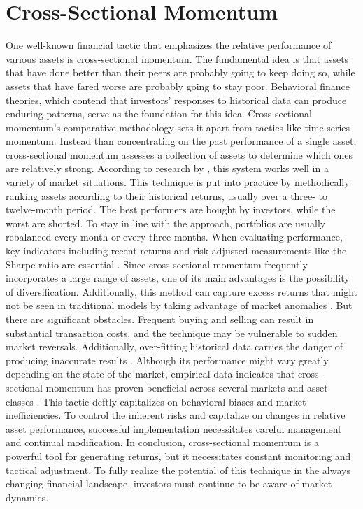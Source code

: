 \documentclass[11pt,a4paper,english,oneside]{book}
\begin{document}
\section{Cross-Sectional Momentum}
One well-known financial tactic that emphasizes the relative performance of various assets is cross-sectional momentum. The fundamental idea is that assets that have done better than their peers are probably going to keep doing so, while assets that have fared worse are probably going to stay poor. Behavioral finance theories, which contend that investors' responses to historical data can produce enduring patterns, serve as the foundation for this idea.
Cross-sectional momentum's comparative methodology sets it apart from tactics like time-series momentum. Instead than concentrating on the past performance of a single asset, cross-sectional momentum assesses a collection of assets to determine which ones are relatively strong. According to research by \cite{jegadeesh1993returns}, this system works well in a variety of market situations.
This technique is put into practice by methodically ranking assets according to their historical returns, usually over a three- to twelve-month period. The best performers are bought by investors, while the worst are shorted. To stay in line with the approach, portfolios are usually rebalanced every month or every three months. When evaluating performance, key indicators including recent returns and risk-adjusted measurements like the Sharpe ratio are essential \parencite{fama1996multifactor}. 
Since cross-sectional momentum frequently incorporates a large range of assets, one of its main advantages is the possibility of diversification. Additionally, this method can capture excess returns that might not be seen in traditional models by taking advantage of market anomalies \parencite{moskowitz2012time}. But there are significant obstacles. Frequent buying and selling can result in substantial transaction costs, and the technique may be vulnerable to sudden market reversals. Additionally, over-fitting historical data carries the danger of producing inaccurate results \parencite{barroso2015momentum}. Although its performance might vary greatly depending on the state of the market, empirical data indicates that cross-sectional momentum has proven beneficial across several markets and asset classes \parencite{asness2013value}. This tactic deftly capitalizes on behavioral biases and market inefficiencies. To control the inherent risks and capitalize on changes in relative asset performance, successful implementation necessitates careful management and continual modification.
In conclusion, cross-sectional momentum is a powerful tool for generating returns, but it necessitates constant monitoring and tactical adjustment. To fully realize the potential of this technique in the always changing financial landscape, investors must continue to be aware of market dynamics.
\end{document}
